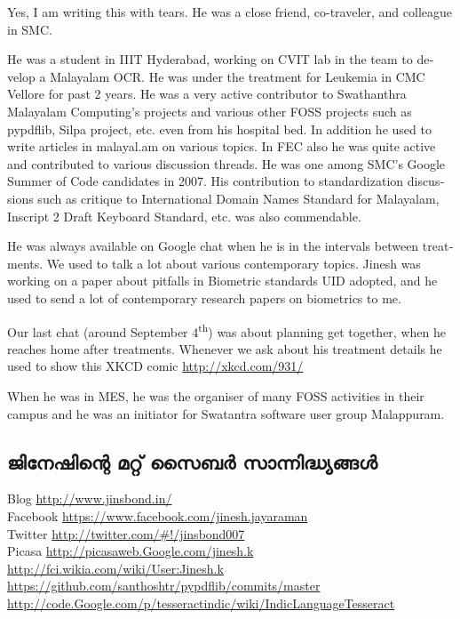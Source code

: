 \enlargethispage*{3\baselineskip}
\begin{english}
Yes, I am writing this with tears. He was a close friend,
co-traveler, and colleague in SMC.

He was a student in IIIT Hyderabad, working on CVIT lab in the team
to develop a Malayalam OCR. He was under the treatment for Leukemia in
CMC Vellore for past 2 years. He was a very active contributor to
Swathanthra Malayalam Computing's projects and various other FOSS
projects such as pypdflib, Silpa project, etc. even from his hospital
bed. In addition he used to write articles in malayal.am on various
topics. In FEC also he was quite active and contributed to various
discussion threads. He was one among SMC's  Google Summer of Code
candidates in 2007. His contribution to standardization discussions
such as critique to International Domain Names Standard for Malayalam,
Inscript 2 Draft Keyboard Standard, etc. was also commendable.

He was always available on Google chat when he is in the intervals
between treatments. We used to talk a lot about various contemporary
topics. Jinesh was working on a paper about pitfalls in Biometric
standards UID adopted, and he used to send a lot of contemporary
research papers on biometrics to me.

Our last chat (around September 4\textsuperscript{th}) was about planning get together, when
he reaches home after treatments.
Whenever we ask about his treatment details he used to show this XKCD comic
\url{http://xkcd.com/931/}

When he was in MES, he was the organiser of many FOSS activities in
their campus and he was an initiator for Swatantra software user group
Malappuram.
\end{english}

\subsection*{ജിനേഷിന്റെ മറ്റ് സൈബര്‍ സാന്നിദ്ധ്യങ്ങള്‍}
Blog \url{http://www.jinsbond.in/} \\
Facebook \url{https://www.facebook.com/jinesh.jayaraman} \\
Twitter \url{http://twitter.com/#!/jinsbond007} \\
Picasa \url{http://picasaweb.Google.com/jinesh.k} \\
\url{http://fci.wikia.com/wiki/User:Jinesh.k} \\
\url{https://github.com/santhoshtr/pypdflib/commits/master} \\
\url{http://code.Google.com/p/tesseractindic/wiki/IndicLanguageTesseract}
\newpage
